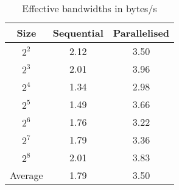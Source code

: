 \begin{table}[h!tb]
    \centering
    \caption{\label{table:bandwidths}Effective bandwidths in bytes/s}
    \begin{tabular}{@{} c c c @{}}
    \toprule
        \textbf{Size} & \textbf{Sequential}& \textbf{Parallelised}\\
    \midrule
        $2^2$ & 2.12 & 3.50\\
    \lightrule
        $2^3$ & 2.01 & 3.96\\
    \lightrule
        $2^4$ & 1.34 & 2.98\\
    \lightrule
        $2^5$ & 1.49 & 3.66\\
    \lightrule
        $2^6$ & 1.76 & 3.22\\
    \lightrule
        $2^7$ & 1.79 & 3.36\\
    \lightrule
        $2^8$ & 2.01 & 3.83 \\
    \midrule
        Average & 1.79 & 3.50\\
    \bottomrule
    \end{tabular}
\end{table}